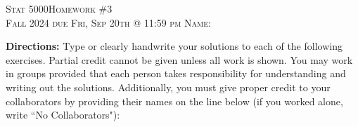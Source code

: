 \documentclass[11pt]{article}
\begin{document}
\large \noindent \textsc{Stat 5000}\hfill \large{\textsc{Homework \#3}} \hfill {} \\
\large \textsc{Fall 2024}  \hfill \textsc{due Fri, Sep 20th @ 11:59 pm} \hfill \textsc{Name:} \underline{\hspace{2in}} \\

\vspace{14pt}

\noindent \textbf{Directions:} Type or clearly handwrite your solutions to each of the following exercises.  Partial credit cannot be given unless all work is shown. You may work in groups provided that each person takes responsibility for understanding and writing out the solutions. Additionally, you must give proper credit to your collaborators by providing their names on the line below (if you worked alone, write ``No Collaborators"):
\vspace{14pt}
\\ \underline{\hspace{7in}}
\vspace{14pt}
\end{document}
